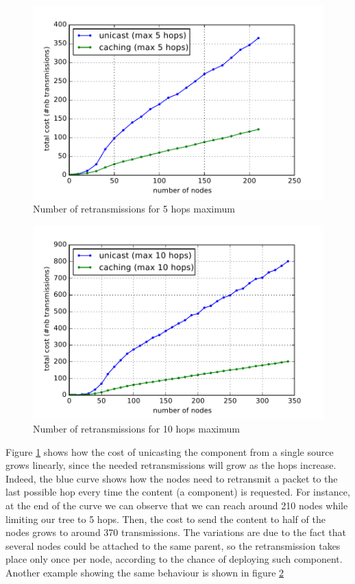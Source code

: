 \begin{figure}[]
	\centering
	\includegraphics[width=0.8 \columnwidth]{chapters/inter-node.images/nb-of-retransmitions-5.pdf}
	\caption{Number of retransmissions for 5 hops maximum} \label{fig:NumberOfRetransmission5hops}
\end{figure}

\begin{figure}[]
	\centering
	\includegraphics[width=0.8 \columnwidth]{chapters/inter-node.images/nb-of-retransmitions-10.pdf}
	\caption{Number of retransmissions for 10 hops maximum} \label{fig:NumberOfRetransmission10hops}
\end{figure}

Figure \ref{fig:NumberOfRetransmission5hops} shows how the cost of unicasting the component from a single source grows linearly, since the needed retransmissions will grow as the hops increase.
Indeed, the blue curve shows how the nodes need to retransmit a packet to the last possible hop every time the content (a component) is requested.
For instance, at the end of the curve we can observe that we can reach around 210 nodes while limiting our tree to 5 hops.
Then, the cost to send the content to half of the nodes grows to around 370 transmissions.
The variations are due to the fact that several nodes could be attached to the same parent, so the retransmission takes place only once per node, according to the chance of deploying such component.
Another example showing the same behaviour is shown in figure \ref{fig:NumberOfRetransmission10hops}

